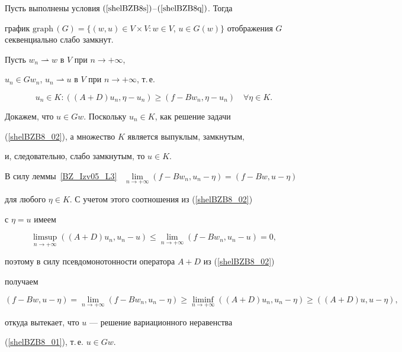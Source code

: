 \begin{lem} \label{BZ_Izv05_L5}


Пусть выполнены условия $(\ref{shelBZB8s})$--$(\ref{shelBZB8q})$. Тогда


график $\mathrm{graph}\,(G)=\{(w,u) \in V \times V : w \in V$, $u \in


G(w)\}$ отображения $G$ секвенциально слабо замкнут.


\end{lem}





\begin{pf}


Пусть $w_n \rightharpoonup w$ в $V$ при $n \to+\infty$,


$u_n \in G w_n$, $u_n \rightharpoonup u$ в $V$ при $n \to+\infty$, т.\,е.


\begin{equation}


u_n \in K : ((A+D) u_n, \eta-u_n)\geq (f-B w_n, \eta-u_n)


\quad \forall \eta \in K.


\label{shelBZB8_02}


\end{equation}


Докажем, что $u \in G w$. Поскольку $u_n \in K$, как решение задачи


(\ref{shelBZB8_02}), а множество $K$ является выпуклым, замкнутым,


и, следовательно, слабо замкнутым, то $u \in K$.


В силу леммы~\ref{BZ_Izv05_L3} \ $\lim\limits_{n \to+\infty}


(f-B w_n, u_n-\eta)=(f-B w, u -\eta)$


для любого $\eta \in K$. С учетом этого соотношения из (\ref{shelBZB8_02})


с $\eta=u$ имеем


$$


\limsup_{n \to+\infty} ((A+D) u_n, u_n-u) \leq


\lim_{n \to+\infty} (f-B w_n, u_n-u)=0,


$$


поэтому в силу псевдомонотонности оператора $A+D$ из (\ref{shelBZB8_02})


получаем


$$


(f-B w, u-\eta)=\lim_{n \to+\infty} (f-B w_n, u_n -\eta)\geq


\liminf_{n \to+\infty} ((A+D) u_n, u_n-\eta) \geq((A+D) u, u-\eta),


$$


откуда вытекает, что $u$ --- решение вариационного неравенства


(\ref{shelBZB8_01}), т.\,е. $u \in G w$.


\end{pf}





